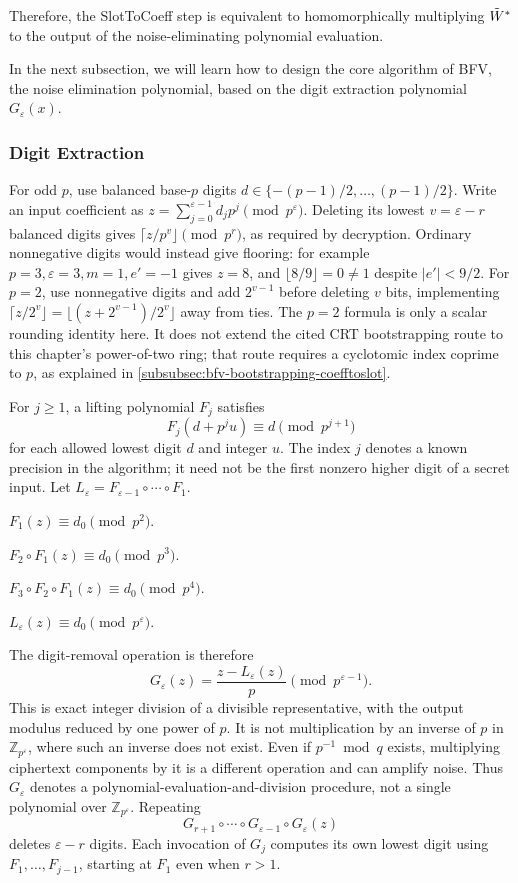 Therefore, the \textsf{SlotToCoeff} step is equivalent to homomorphically multiplying $\tilde{W}^*$ to the output of the noise-eliminating polynomial evaluation.  

In the next subsection, we will learn how to design the core algorithm of BFV, the noise elimination polynomial, based on the digit extraction polynomial $G_\varepsilon(x)$. 


\subsubsection{Digit Extraction}
\label{subsubsec:bfv-bootstrapping-digit-extraction}


For odd $p$, use balanced base-$p$ digits $d\in\{-(p-1)/2,\ldots,(p-1)/2\}$. Write an input coefficient as $z=\sum_{j=0}^{\varepsilon-1}d_jp^j\pmod{p^\varepsilon}$. Deleting its lowest $v=\varepsilon-r$ balanced digits gives $\lceil z/p^v\rfloor\pmod{p^r}$, as required by decryption. Ordinary nonnegative digits would instead give flooring: for example $p=3,\varepsilon=3,m=1,e'=-1$ gives $z=8$, and $\lfloor8/9\rfloor=0\ne1$ despite $|e'|<9/2$. For $p=2$, use nonnegative digits and add $2^{v-1}$ before deleting $v$ bits, implementing $\lceil z/2^v\rfloor=\lfloor(z+2^{v-1})/2^v\rfloor$ away from ties. The $p=2$ formula is only a scalar rounding identity here. It does not extend the cited CRT bootstrapping route to this chapter's power-of-two ring; that route requires a cyclotomic index coprime to $p$, as explained in \autoref{subsubsec:bfv-bootstrapping-coefftoslot}.

For $j\geq1$, a lifting polynomial $F_j$ satisfies
\[
F_j(d+p^ju)\equiv d\pmod{p^{j+1}}
\]
for each allowed lowest digit $d$ and integer $u$. The index $j$ denotes a known precision in the algorithm; it need not be the first nonzero higher digit of a secret input. Let $L_\varepsilon=F_{\varepsilon-1}\circ\cdots\circ F_1$.

 $F_1(z)\equiv d_0\pmod{p^2}$.

 $F_2\circ F_1(z)\equiv d_0\pmod{p^3}$.

 $F_3\circ F_2\circ F_1(z)\equiv d_0\pmod{p^4}$.

 $L_\varepsilon(z)\equiv d_0\pmod{p^\varepsilon}$.

The digit-removal operation is therefore
\[
G_\varepsilon(z)=\frac{z-L_\varepsilon(z)}p\pmod{p^{\varepsilon-1}}.
\]
This is exact integer division of a divisible representative, with the output modulus reduced by one power of $p$. It is not multiplication by an inverse of $p$ in $\mathbb Z_{p^\varepsilon}$, where such an inverse does not exist. Even if $p^{-1}\bmod q$ exists, multiplying ciphertext components by it is a different operation and can amplify noise. Thus $G_\varepsilon$ denotes a polynomial-evaluation-and-division procedure, not a single polynomial over $\mathbb Z_{p^\varepsilon}$. Repeating
\[
G_{r+1}\circ\cdots\circ G_{\varepsilon-1}\circ G_\varepsilon(z)
\]
deletes $\varepsilon-r$ digits. Each invocation of $G_j$ computes its own lowest digit using $F_1,\ldots,F_{j-1}$, starting at $F_1$ even when $r>1$.


